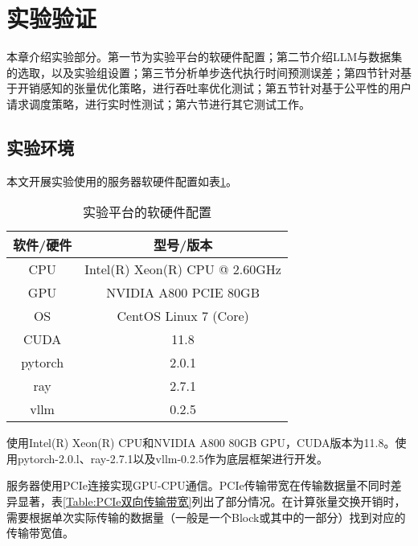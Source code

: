 \section{实验验证}

本章介绍实验部分。第一节为实验平台的软硬件配置；第二节介绍LLM与数据集的选取，以及实验组设置；第三节分析单步迭代执行时间预测误差；第四节针对基于开销感知的张量优化策略，进行吞吐率优化测试；第五节针对基于公平性的用户请求调度策略，进行实时性测试；第六节进行其它测试工作。

\subsection{实验环境}

本文开展实验使用的服务器软硬件配置如表\ref{Table:实验平台的软硬件配置}。

\begin{table}[H]
  \centering
  \caption{实验平台的软硬件配置}
  \label{Table:实验平台的软硬件配置}
  \renewcommand{\arraystretch}{1.25}
  \small
  \begin{tabular}{c c}
    \toprule
    \textbf{软件/硬件} & \textbf{型号/版本} \\ 
    \midrule
    CPU & Intel(R) Xeon(R) CPU @ 2.60GHz  \\ 
    GPU & NVIDIA A800 PCIE 80GB \\ 
    OS & CentOS Linux 7 (Core) \\ 
    CUDA & 11.8 \\ 
    pytorch & 2.0.1 \\ 
    ray & 2.7.1 \\
    vllm & 0.2.5 \\ 
    \bottomrule
  \end{tabular}
\end{table}

使用Intel(R) Xeon(R) CPU和NVIDIA A800 80GB GPU，CUDA版本为11.8。使用pytorch-2.0.l、ray-2.7.1以及vllm-0.2.5作为底层框架进行开发。 \par

服务器使用PCIe连接实现GPU-CPU通信。PCIe传输带宽在传输数据量不同时差异显著，表\ref{Table:PCIe双向传输带宽}列出了部分情况。在计算张量交换开销时，需要根据单次实际传输的数据量（一般是一个Block或其中的一部分）找到对应的传输带宽值。

